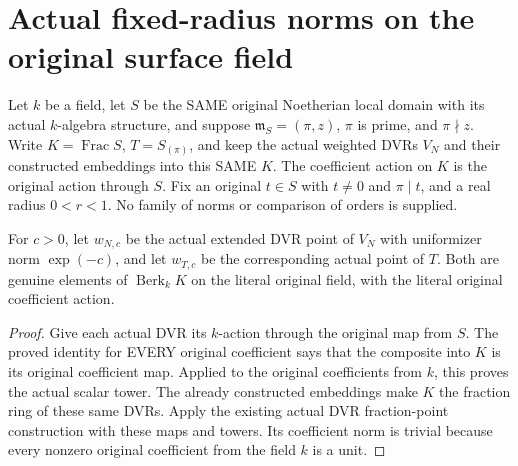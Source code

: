 \section{Actual fixed-radius norms on the original surface field}

Let $k$ be a field, let $S$ be the SAME original Noetherian local domain
with its actual $k$-algebra structure, and suppose
$\mathfrak m_S=(\pi,z)$, $\pi$ is prime, and $\pi\nmid z$.
Write $K=\operatorname{Frac}S$, $T=S_{(\pi)}$, and keep the actual weighted
DVRs $V_N$ and their constructed embeddings into this SAME $K$.
The coefficient action on $K$ is the original action through $S$.
Fix an original $t\in S$ with $t\ne0$ and $\pi\mid t$, and a real radius
$0<r<1$. No family of norms or comparison of orders is supplied.

\begin{definition}
\label{def:gauss-surface-actual-scaled-field-points}
\leanok
\leavevmode\par
For $c>0$, let $w_{N,c}$ be the actual extended DVR point of $V_N$ with
uniformizer norm $\exp(-c)$, and let $w_{T,c}$ be the corresponding actual
point of $T$. Both are genuine elements of $\operatorname{Berk}_k K$ on
the literal original field, with the literal original coefficient action.
\end{definition}
\begin{proof}
Give each actual DVR its $k$-action through the original map from $S$.
The proved identity for EVERY original coefficient says that
the composite into $K$ is its original coefficient map. Applied to the
original coefficients from $k$, this proves the actual scalar tower.
The already constructed embeddings make $K$ the fraction ring of these
same DVRs. Apply the existing actual DVR fraction-point construction with
these maps and towers. Its coefficient norm is trivial because every
nonzero original coefficient from the field $k$ is a unit.
\end{proof}

